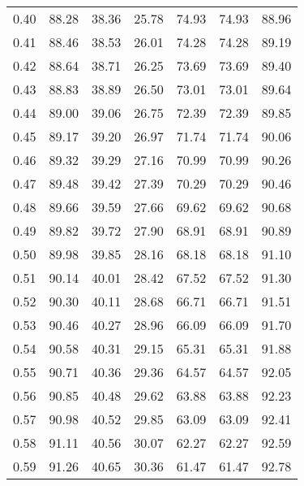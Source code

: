\begin{tabular}{|c|c|c|c|c|c|c|}
      0.40 &     88.28 &     38.36 &      25.78 &   74.93 &      74.93 &         88.96 \\
      0.41 &     88.46 &     38.53 &      26.01 &   74.28 &      74.28 &         89.19 \\
      0.42 &     88.64 &     38.71 &      26.25 &   73.69 &      73.69 &         89.40 \\
      0.43 &     88.83 &     38.89 &      26.50 &   73.01 &      73.01 &         89.64 \\
      0.44 &     89.00 &     39.06 &      26.75 &   72.39 &      72.39 &         89.85 \\
      0.45 &     89.17 &     39.20 &      26.97 &   71.74 &      71.74 &         90.06 \\
      0.46 &     89.32 &     39.29 &      27.16 &   70.99 &      70.99 &         90.26 \\
      0.47 &     89.48 &     39.42 &      27.39 &   70.29 &      70.29 &         90.46 \\
      0.48 &     89.66 &     39.59 &      27.66 &   69.62 &      69.62 &         90.68 \\
      0.49 &     89.82 &     39.72 &      27.90 &   68.91 &      68.91 &         90.89 \\
      0.50 &     89.98 &     39.85 &      28.16 &   68.18 &      68.18 &         91.10 \\
      0.51 &     90.14 &     40.01 &      28.42 &   67.52 &      67.52 &         91.30 \\
      0.52 &     90.30 &     40.11 &      28.68 &   66.71 &      66.71 &         91.51 \\
      0.53 &     90.46 &     40.27 &      28.96 &   66.09 &      66.09 &         91.70 \\
      0.54 &     90.58 &     40.31 &      29.15 &   65.31 &      65.31 &         91.88 \\
      0.55 &     90.71 &     40.36 &      29.36 &   64.57 &      64.57 &         92.05 \\
      0.56 &     90.85 &     40.48 &      29.62 &   63.88 &      63.88 &         92.23 \\
      0.57 &     90.98 &     40.52 &      29.85 &   63.09 &      63.09 &         92.41 \\
      0.58 &     91.11 &     40.56 &      30.07 &   62.27 &      62.27 &         92.59 \\
      0.59 &     91.26 &     40.65 &      30.36 &   61.47 &      61.47 &         92.78 \\

\end{tabular}
